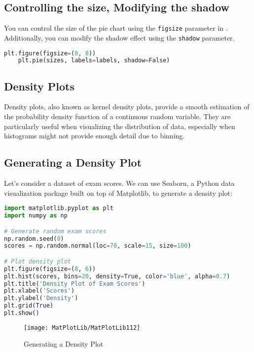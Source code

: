 \subsection*{Controlling the size, Modifying the shadow}

You can control the size of the pie chart using the \texttt{figsize} parameter in . Additionally, you can modify the shadow effect using the \texttt{shadow} parameter.

\begin{lstlisting}[language=Python]
	plt.figure(figsize=(8, 8))
	plt.pie(sizes, labels=labels, shadow=False)
\end{lstlisting}


\subsection{Density Plots}

Density plots, also known as kernel density plots, provide a smooth estimation of the probability density function of a continuous random variable. They are particularly useful when visualizing the distribution of data, especially when histograms might not provide enough detail due to binning. \cite{Tosi:2009}

\subsection*{Generating a Density Plot}

Let's consider a dataset of exam scores. We can use Seaborn, a Python data visualization package built on top of Matplotlib, to generate a density plot:

\begin{lstlisting}[language=Python, caption={Generating a Density Plot}]
import matplotlib.pyplot as plt
import numpy as np

# Generate random exam scores
np.random.seed(0)
scores = np.random.normal(loc=70, scale=15, size=100)

# Plot density plot
plt.figure(figsize=(8, 6))
plt.hist(scores, bins=20, density=True, color='blue', alpha=0.7)
plt.title('Density Plot of Exam Scores')
plt.xlabel('Scores')
plt.ylabel('Density')
plt.grid(True)
plt.show()
\end{lstlisting}


\begin{figure}[h]
	\centering
	\texttt{[image: MatPlotLib/MatPlotLib112]}
	\caption{Generating a Density Plot}\label{Matplotlib112}
\end{figure}


